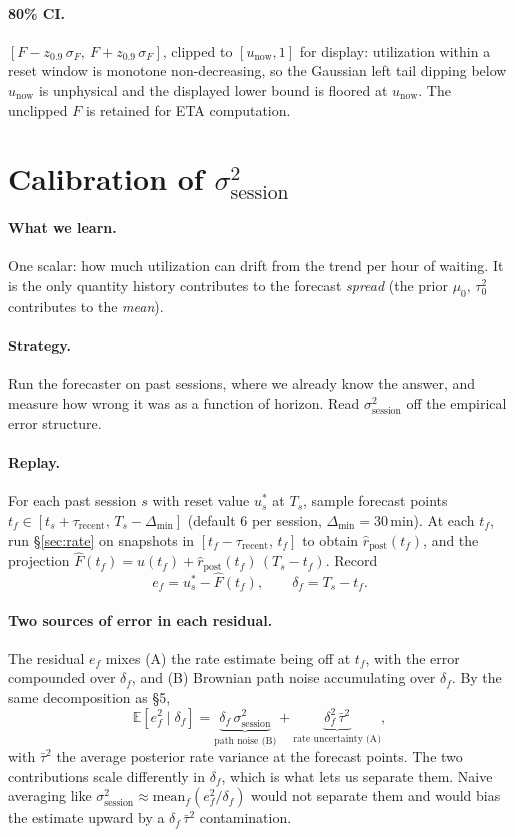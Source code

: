 \documentclass[11pt]{article}
\newcommand{\rpost}{\hat r_{\text{post}}}
\newcommand{\tauzerosq}{\tau_0^2}
\newcommand{\sigsessionsq}{\sigma_{\text{session}}^2}
\newcommand{\unow}{u_{\text{now}}}
\newcommand{\taurecent}{\tau_{\text{recent}}}
\begin{document}
\paragraph{80\% CI.} $[F - z_{0.9}\,\sigma_F,\ F + z_{0.9}\,\sigma_F]$,
clipped to $[\unow, 1]$ for display: utilization within a reset window is
monotone non-decreasing, so the Gaussian left tail dipping below $\unow$ is
unphysical and the displayed lower bound is floored at $\unow$. The unclipped
$F$ is retained for ETA computation.

\section{Calibration of $\sigsessionsq$}\label{sec:calib}

\paragraph{What we learn.} One scalar: how much utilization can drift from
the trend per hour of waiting. It is the only quantity history contributes
to the forecast \emph{spread} (the prior $\mu_0,\,\tauzerosq$ contributes to
the \emph{mean}).

\paragraph{Strategy.} Run the forecaster on past sessions, where we already
know the answer, and measure how wrong it was as a function of horizon.
Read $\sigsessionsq$ off the empirical error structure.

\paragraph{Replay.} For each past session $s$ with reset value $u_s^\ast$ at
$T_s$, sample forecast points $t_f \in [t_s + \taurecent,\, T_s -
\Delta_{\min}]$ (default 6 per session, $\Delta_{\min} = 30$\,min). At each
$t_f$, run \S\ref{sec:rate} on snapshots in $[t_f - \taurecent,\, t_f]$ to
obtain $\rpost(t_f)$, and the projection $\hat F(t_f) = u(t_f) +
\rpost(t_f)\,(T_s - t_f)$. Record
\[
  e_f = u_s^\ast - \hat F(t_f),
  \qquad
  \delta_f = T_s - t_f.
\]

\paragraph{Two sources of error in each residual.} The residual $e_f$ mixes
(A) the rate estimate being off at $t_f$, with the error compounded over
$\delta_f$, and (B) Brownian path noise accumulating over $\delta_f$. By the
same decomposition as \S5,
\[
  \mathbb{E}[e_f^2 \mid \delta_f]
  = \underbrace{\delta_f\,\sigsessionsq}_{\text{path noise (B)}}
  + \underbrace{\delta_f^2\,\bar\tau^2}_{\text{rate uncertainty (A)}},
\]
with $\bar\tau^2$ the average posterior rate variance at the forecast
points. The two contributions scale differently in $\delta_f$, which is what
lets us separate them. Naive averaging like $\sigsessionsq \approx
\mathrm{mean}_f(e_f^2 / \delta_f)$ would not separate them and would bias
the estimate upward by a $\delta_f\,\bar\tau^2$ contamination.
\end{document}
